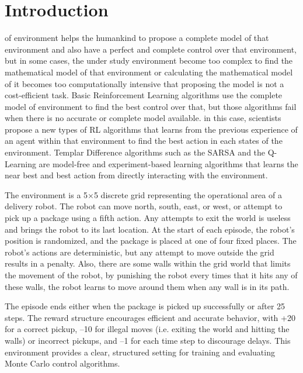 \documentclass[lettersize,journal]{IEEEtran}
\begin{document}
\section{Introduction}
 of environment helps the humankind to propose a complete model of that environment and also have a perfect and complete control over that environment, but in some cases, the under study environment become too complex to find the mathematical model of that environment or calculating the mathematical model of it becomes too computationally intensive that proposing the model is not a cost-efficient task. Basic Reinforcement Learning algorithms use the complete model of environment to find the best control over that, but those algorithms fail when there is no accurate or complete model available. in this case, scientists propose a new types of RL algorithms that learns from the previous experience of an agent within that environment to find the best action in each states of the environment. Templar Difference algorithms such as the SARSA and the Q-Learning are model-free and experiment-based learning algorithms that learns the near best and best action from directly interacting with the environment.\par

The environment is a 5×5 discrete grid representing the operational area of a delivery robot. The robot can move north, south, east, or west, or attempt to pick up a package using a fifth action. Any attempts to exit the world is useless and brings the robot to its last location. At the start of each episode, the robot's position is randomized, and the package is placed at one of four fixed places. The robot's actions are deterministic, but any attempt to move outside the grid results in a penalty. Also, there are some walls within the grid world that limits the movement of the robot, by punishing the robot every times that it hits any of these walls, the robot learns to move around them when any wall is in its path.\par

The episode ends either when the package is picked up successfully or after 25 steps. The reward structure encourages efficient and accurate behavior, with +20 for a correct pickup, –10 for illegal moves (i.e. exiting the world and hitting the walls) or incorrect pickups, and –1 for each time step to discourage delays. This environment provides a clear, structured setting for training and evaluating Monte Carlo control algorithms. \par
\end{document}
